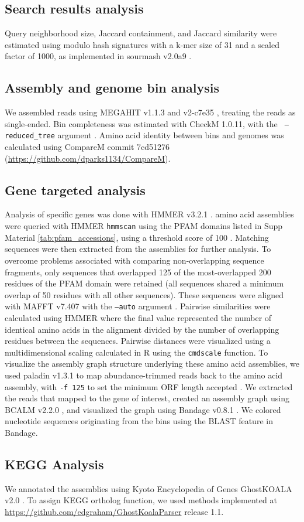 \subsection*{Search results analysis}

Query neighborhood size, Jaccard containment, and Jaccard similarity
were estimated using modulo hash signatures with a k-mer size of 31 and
a scaled factor of 1000, as implemented in sourmash v2.0a9
\cite{sourmash}.

\subsection*{Assembly and genome bin analysis}

We assembled reads using MEGAHIT v1.1.3 \cite{megahit} and \plass
v2-c7e35 \cite{plass}, treating the reads as single-ended. Bin
completeness was estimated with CheckM 1.0.11, with the {\tt
  --reduced\_tree} argument \cite{CheckM}.  Amino acid identity
between bins and genomes was calculated using CompareM commit
7cd51276 (\url{https://github.com/dparks1134/CompareM}).

\subsection*{Gene targeted analysis}

Analysis of specific genes was done with HMMER v3.2.1
\cite{hmmer}. \plass amino acid assemblies were queried with HMMER {\tt hmmscan}
 using the PFAM domains listed in Supp Material \ref{tab:pfam_accessions}, 
using a threshold score of 100 \cite{pfam}. Matching sequences were then
extracted from the assemblies for further analysis. To overcome
problems associated with comparing non-overlapping sequence fragments,
only sequences that overlapped 125 of the most-overlapped 200 residues
of the PFAM domain were retained (all sequences shared a minimum
overlap of 50 residues with all other sequences). These sequences were
aligned with MAFFT v7.407 with the {\tt --auto} argument \cite{mafft}. Pairwise similarities were
calculated using HMMER where the final value represented the number of
identical amino acids in the alignment divided by the number of
overlapping residues between the sequences. Pairwise distances were
visualized using a multidimensional scaling calculated in R using the
{\tt cmdscale} function. To visualize the assembly graph structure
underlying these amino acid assemblies, we used paladin v1.3.1 
to map abundance-trimmed reads back to the \plass amino acid assembly,
with {\tt -f 125} to set the minimum ORF length accepted \cite{paladin}. 
We extracted the reads that mapped to the gene of interest, created an
assembly graph using BCALM v2.2.0 \cite{chikhi2016compacting}, and
visualized the graph using Bandage v0.8.1 \cite{bandage}. We colored
nucleotide sequences originating from the bins using the BLAST feature
in Bandage.

\subsection*{KEGG Analysis}

We annotated the \plass assemblies using Kyoto Encyclopedia of Genes
GhostKOALA v2.0 \cite{kegg}. To assign KEGG ortholog function, we used
methods implemented at \url{https://github.com/edgraham/GhostKoalaParser}
release 1.1.
